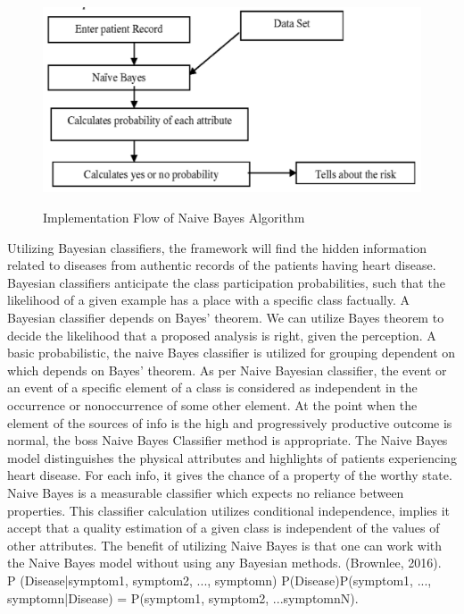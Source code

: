 \documentclass[oneside,12pt]{Classes/VTU}
\begin{document}
    	\begin{figure}[h]
    		\begin{center}
    			\includegraphics[width = 15cm]{images/naive_bayes.png}\\
    			\caption{Implementation Flow of Naive Bayes Algorithm}
    		\end{center}
    	\end{figure}
    	
       	Utilizing Bayesian classifiers, the framework will find the hidden information related to diseases from authentic records of the patients having heart disease. Bayesian classifiers anticipate the class participation probabilities, such that the likelihood of a given example has a place with a specific class factually. A Bayesian classifier depends on Bayes' theorem. We can utilize Bayes theorem to decide the likelihood that a proposed analysis is right, given the perception. A basic probabilistic, the naive Bayes classifier is utilized for grouping dependent on which depends on Bayes' theorem. As per Naive Bayesian classifier, the event or an event of a specific element of a class is considered as independent in the occurrence or nonoccurrence of some other element. At the point when the element of the sources of info is the high and progressively productive outcome is normal, the boss Naive Bayes Classifier method is appropriate. The Naive Bayes model distinguishes the physical attributes and highlights of patients experiencing heart disease. For each info, it gives the chance of a property of the worthy state. Naive Bayes is a measurable classifier which expects no reliance between properties. This classifier calculation utilizes conditional independence, implies it accept that a quality estimation of a given class is independent of the values of other attributes. The benefit of utilizing Naive Bayes is that one can work with the Naive Bayes model without using any Bayesian methods. (Brownlee, 2016). \\
    	P (Disease|symptom1, symptom2, ..., symptomn) P(Disease)P(symptom1, ..., symptomn|Disease) = P(symptom1, symptom2, ...symptomnN).\\
    	
\end{document}
